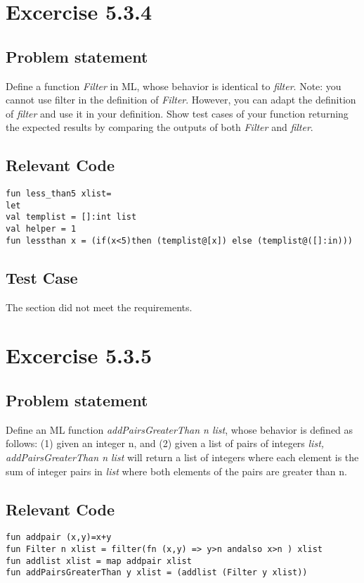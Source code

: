\documentclass{report}
\begin{document}
\chapter{Excercise 5.3.4}
\label{cha:5.3.4}


\section{Problem statement}
\label{problem-statement-5-3-4}
Define a function \emph{Filter} in ML, whose behavior is identical to \emph{filter}. Note: you cannot use filter in the definition of \emph{Filter}. However, you can adapt the definition of \emph{filter} and use it in your definition. Show test cases of your function returning the expected results by comparing the outputs of both \emph{Filter} and \emph{filter}.

\section{Relevant Code}
\label{rel-code-3-4-2}
\begin{lstlisting}[frame=TB]
fun less_than5 xlist=
let
val templist = []:int list
val helper = 1
fun lessthan x = (if(x<5)then (templist@[x]) else (templist@([]:in)))
\end{lstlisting}

\section{Test Case}
\label{test-results-3-4-2}
The section did not meet the requirements.

\chapter{Excercise 5.3.5}
\label{ex-5-3-5}

\section{Problem statement}
\label{problem-statement-5-3-5}
Define an ML function \emph{addPairsGreaterThan n list}, whose behavior is defined as follows: (1) given an integer n, and (2) given a list of pairs of integers \emph{list, addPairsGreaterThan n list} will return a list of integers where each element is the sum of integer pairs in \emph{list} where both 	elements of the pairs are greater than n.

\section{Relevant Code}
\label{rel-code-4-6-4}
\begin{lstlisting}[frame=TB]
fun addpair (x,y)=x+y
fun Filter n xlist = filter(fn (x,y) => y>n andalso x>n ) xlist
fun addlist xlist = map addpair xlist
fun addPairsGreaterThan y xlist = (addlist (Filter y xlist)) 

\end{lstlisting}
\end{document}
